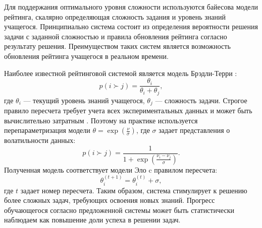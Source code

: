 Для поддержания оптимального уровня сложности используются байесова модели рейтинга, скалярно определяющая сложность
задания и уровень знаний учащегося. Принципиально система состоит из определения вероятности решения задачи с заданной сложностью
и правила обновления рейтинга согласно результату решения. Преимуществом таких систем является возможность обновления рейтинга 
учащегося в реальном времени.

Наиболее известной рейтинговой системой является модель Брэдли-Терри \cite{bradley1952rank}:
\begin{equation}
    p(i \succ j) = \frac{\theta_i}{\theta_i +\theta_j},
\end{equation}
где $\theta_i$ --- текущий уровень знаний учащегося, $\theta_j$ --- сложность задачи. Строгое правило пересчета требует
учета всех экспериментальных данных и может быть вычислительно затратным \cite{hunter2004mm}. Поэтому на практике 
используется перепараметризация модели $\theta = \exp(\frac{\nu}{\sigma})$, где $\sigma$ задает представления о 
волатильности данных:
\begin{equation}
    p(i \succ j) = \frac{1}{1 + \exp(\frac{\nu_i-\nu_j}{\sigma})}.
\end{equation}
Полученная модель соответствует модели Эло \cite{elo1967proposed} c правилом пересчета:
\begin{equation}
    \theta_i^{(t+1)} = \theta_i^{(t)} + \sigma,
\end{equation}
где $t$ задает номер пересчета. Таким образом, система стимулирует к решению более сложных задач, 
требующих освоения новых знаний.
Прогресс обучающегося согласно предложенной системы может быть статистически наблюдаем как 
повышение доли успеха в решении задач. 

